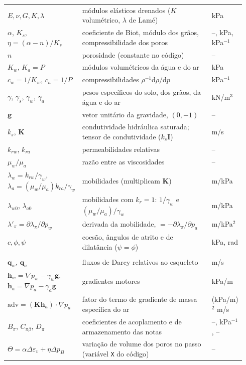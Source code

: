 \documentclass[11pt,a4paper]{article}
\numberwithin{equation}{section}
\newcommand{\dd}{\mathrm{d}}
\newcommand{\Id}{\mathbf I}
\newcommand{\pabs}{P}
\newcommand{\code}[1]{\texttt{#1}}
\begin{document}
{\begin{longtable}{@{}>{\raggedright\arraybackslash}p{0.22\linewidth}>{\raggedright\arraybackslash}p{0.58\linewidth}>{\raggedright\arraybackslash}p{0.14\linewidth}@{}}
$E,\nu,G,K,\lambda$ & módulos elásticos drenados ($K$ volumétrico, $\lambda$ de Lamé) & kPa\\
$\alpha$, $K_s$, $\eta=(\alpha-n)/K_s$ & coeficiente de Biot, módulo dos grãos, compressibilidade dos poros & --, kPa, kPa$^{-1}$\\
$n$ & porosidade (constante no código) & --\\
$K_w$, $K_a=\pabs$ & módulos volumétricos da água e do ar & kPa\\
$c_w=1/K_w$, $c_a=1/\pabs$ & compressibilidades $\rho^{-1}\dd\rho/\dd p$ & kPa$^{-1}$\\
$\gamma$, $\gamma_s$, $\gamma_w$, $\gamma_a$ & pesos específicos do solo, dos grãos, da água e do ar & kN/m$^3$\\
$\mathbf g$ & vetor unitário da gravidade, $(0,-1)$ & --\\
$k_s$, $\mathbf K$ & condutividade hidráulica saturada; tensor de condutividade ($k_s\Id$) & m/s\\
$k_{rw}$, $k_{ra}$ & permeabilidades relativas & --\\
$\mu_w/\mu_a$ & razão entre as viscosidades & --\\
$\lambda_w=k_{rw}/\gamma_w$, $\lambda_a=(\mu_w/\mu_a)k_{ra}/\gamma_w$ & mobilidades (multiplicam $\mathbf K$) & m/kPa\\
$\lambda_{w0}$, $\lambda_{a0}$ & mobilidades com $k_r=1$: $1/\gamma_w$ e $(\mu_w/\mu_a)/\gamma_w$ & m/kPa\\
$\lambda'_\pi=\partial\lambda_\pi/\partial p_w$ & derivada da mobilidade, $=-\partial\lambda_\pi/\partial p_a$ & m/kPa$^2$\\
$c,\phi,\psi$ & coesão, ângulos de atrito e de dilatância ($\psi=\phi$) & kPa, rad\\
\multicolumn{3}{@{}l}{\emph{Fluxos e balanços}}\\
$\mathbf q_w$, $\mathbf q_a$ & fluxos de Darcy relativos ao esqueleto & m/s\\
$\mathbf h_w=\nabla p_w-\gamma_w\mathbf g$, $\mathbf h_a=\nabla p_a-\gamma_a\mathbf g$ & gradientes motores & kPa/m\\
$\mathrm{adv}=(\mathbf K\mathbf h_a)\cdot\nabla p_a$ & fator do termo de gradiente de massa específica do ar & (kPa/m)$^2$ m/s\\
$B_\pi$, $C_{\pi\beta}$, $D_\pi$ & coeficientes de acoplamento e de armazenamento das notas & --, kPa$^{-1}$, --\\
$\Theta=\alpha\Delta\varepsilon_v+\eta\Delta p_B$ & variação de volume dos poros no passo (variável \code{X} do código) & --\\

\end{longtable}}
\end{document}
